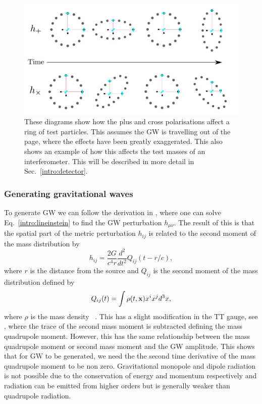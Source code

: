 \begin{figure}[h]
    \centering
    \includegraphics[width=\textwidth]{C1_intro/polarisation_ring.pdf}
 \caption[Plus and Cross polarisations]{These diagrams show how the plus and cross
polarisations affect a ring of test particles. This assumes
the \gls{GW} is travelling out of the page, where the effects
have been greatly exaggerated. This also shows an example of how this
affects the test masses of an interferometer. This will be
described in more detail in Sec.~\ref{intro:detector}.}
\label{gw:polarisations}
\end{figure}



\subsubsection{Generating gravitational waves}

To generate \gls{GW} we can follow the derivation in \citep{flanagan2005BasicsGravitational}, where one can solve Eq.~\ref{intro:lineinstein} to find the \gls{GW} perturbation $h_{\mu \nu}$.
The result of this is that the spatial part of the metric perturbation $h_{i j}$ is related to the second moment of the mass distribution by
\begin{equation}
    \label{intro:gravwave:amp}
        h_{ij} = \frac{2G}{c^4 r}  \frac{d^2}{dt^2} Q_{ij}(t-r/c),
\end{equation}
where $r$ is the distance from the source \citep{letiec2016TheoryGravitational} and $Q_{i j}$ is the second moment of the mass distribution defined by 
\begin{equation}
    Q_{ij}(t) = \int \rho(t,{\bf x})  x^i x^j d^3x,
\end{equation}
where $\rho$ is the mass density ~\citep{flanagan2005BasicsGravitational}.  
This has a slight modification in the TT gauge, see
\citep{flanagan2005BasicsGravitational}, where the trace of the second mass moment is subtracted defining the mass quadrupole moment. 
However, this has the same relationship between the mass quadrupole moment or second mass moment and the \gls{GW} amplitude.  This shows that for \gls{GW} to be generated, we need the the second time derivative of the mass quadrupole moment to be non zero. 
Gravitational monopole and dipole radiation is not possible due to the conservation of energy and momentum respectively \citep{misner1973Gravitation} and radiation can be emitted from higher orders but is generally weaker than quadrupole radiation. 

